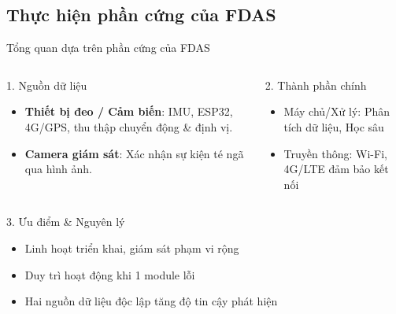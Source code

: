 \subsection{Thực hiện phần cứng của FDAS}

\begin{frame}{Tổng quan dựa trên phần cứng của FDAS}
\small

\begin{columns}[T]
    \begin{block}{1. Nguồn dữ liệu}
    \begin{itemize}
        \item \textbf{Thiết bị đeo / Cảm biến}: IMU, ESP32, 4G/GPS, thu thập chuyển động & định vị.
        \item \textbf{Camera giám sát}: Xác nhận sự kiện té ngã qua hình ảnh.
    \end{itemize}
    \end{block}

    \begin{block}{2. Thành phần chính}
    \begin{itemize}
        \item Máy chủ/Xử lý: Phân tích dữ liệu, Học sâu
        \item Truyền thông: Wi-Fi, 4G/LTE đảm bảo kết nối
    \end{itemize}
    \end{block}
\end{columns}

\vspace{0.3cm}

\begin{block}{3. Ưu điểm \& Nguyên lý}
\begin{itemize}
    \item Linh hoạt triển khai, giám sát phạm vi rộng
    \item Duy trì hoạt động khi 1 module lỗi
    \item Hai nguồn dữ liệu độc lập tăng độ tin cậy phát hiện
\end{itemize}
\end{block}

\end{frame}

